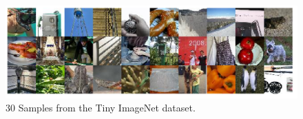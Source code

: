 \begin{figure}[htbp]
  \centering
  \includegraphics[width=\linewidth]{../images/samples.png}
  \caption[]
  {\small
    30 Samples from the Tiny ImageNet dataset.
  }
  \label{fig:architecture}
\end{figure}
